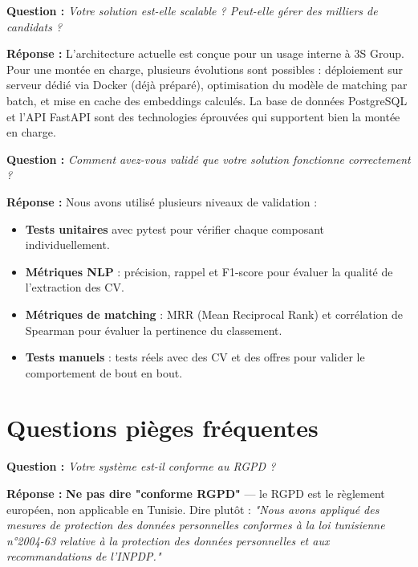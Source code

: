 \documentclass[12pt,a4paper]{article}
\newenvironment{jury}{%
  \def\FrameCommand{\fboxsep=8pt\colorbox{orange!12}}%
  \MakeFramed{\advance\hsize-\width \FrameRestore}%
  \vspace{-4pt}%
}{\endMakeFramed}
\newenvironment{reponse}{%
  \def\FrameCommand{\fboxsep=8pt\colorbox{green!10}}%
  \MakeFramed{\advance\hsize-\width \FrameRestore}%
  \vspace{-4pt}%
}{\endMakeFramed}
\newcommand{\important}[1]{\textbf{\color{rouge}#1}}
\newcommand{\Q}[1]{\vspace{6pt}\noindent\textbf{\color{orange}Question :} \textit{#1}}
\newcommand{\R}[1]{\noindent\textbf{\color{vert}Réponse :} #1\vspace{6pt}}
\begin{document}
\begin{jury}
\Q{Votre solution est-elle scalable ? Peut-elle gérer des milliers de candidats ?}
\end{jury}

\begin{reponse}
\R{L'architecture actuelle est conçue pour un usage interne à 3S Group.
Pour une montée en charge, plusieurs évolutions sont possibles : déploiement sur serveur dédié via Docker (déjà préparé), optimisation du modèle de matching par batch, et mise en cache des embeddings calculés.
La base de données PostgreSQL et l'API FastAPI sont des technologies éprouvées qui supportent bien la montée en charge.}
\end{reponse}

\begin{jury}
\Q{Comment avez-vous validé que votre solution fonctionne correctement ?}
\end{jury}

\begin{reponse}
\R{Nous avons utilisé plusieurs niveaux de validation :
\begin{itemize}[leftmargin=1.5cm]
  \item \textbf{Tests unitaires} avec pytest pour vérifier chaque composant individuellement.
  \item \textbf{Métriques NLP} : précision, rappel et F1-score pour évaluer la qualité de l'extraction des CV.
  \item \textbf{Métriques de matching} : MRR (Mean Reciprocal Rank) et corrélation de Spearman pour évaluer la pertinence du classement.
  \item \textbf{Tests manuels} : tests réels avec des CV et des offres pour valider le comportement de bout en bout.
\end{itemize}}
\end{reponse}

\section{Questions pièges fréquentes}

\begin{jury}
\Q{Votre système est-il conforme au RGPD ?}
\end{jury}

\begin{reponse}
\R{\important{Ne pas dire "conforme RGPD"} — le RGPD est le règlement européen, non applicable en Tunisie.
Dire plutôt : \textit{"Nous avons appliqué des mesures de protection des données personnelles conformes à la loi tunisienne n°2004-63 relative à la protection des données personnelles et aux recommandations de l'INPDP."}}
\end{reponse}
\end{document}
